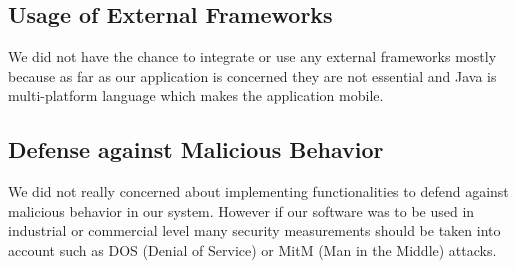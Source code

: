 \subsection{Usage of External Frameworks}

We did not have the chance to integrate or use any external frameworks mostly because as far as our application is concerned they are not essential and Java is multi-platform language which makes the application mobile.\\

\subsection{Defense against Malicious Behavior}

We did not really concerned about implementing functionalities to defend against malicious behavior in our system. However if our software was to be used in industrial or commercial level many security measurements should be taken into account such as DOS (Denial of Service) or MitM (Man in the Middle) attacks.\\